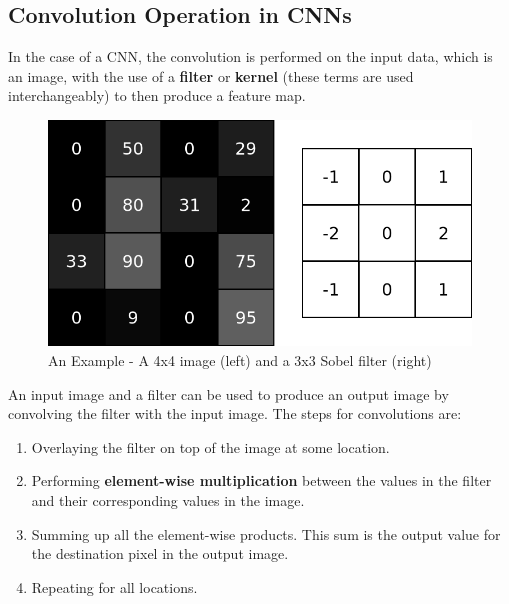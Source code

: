 \documentclass[11pt]{report}
\begin{document}
\subsection{Convolution Operation in CNNs}
In the case of a CNN, the convolution is performed on the input data, which is an image, with the use of a \textbf{filter} or \textbf{kernel} (these terms are used interchangeably) to then produce a feature map.
\begin{figure}[!h] 
	\includegraphics[scale=0.3]{convexample1.png} 
	\centering 
	\caption{An Example - A 4x4 image (left) and a 3x3 Sobel filter (right)}
	\label{convex}
\end{figure}
An input image and a filter can be used to produce an output image by convolving the
filter with the input image. The steps for convolutions are:
\begin{enumerate}
	\item Overlaying the filter on top of the image at some location.
	\item Performing \textbf{element-wise multiplication} between the values in the filter and their corresponding values in the image.
	\item Summing up all the element-wise products. This sum is the output value for the destination pixel in the output image.
	\item Repeating for all locations.
\end{enumerate}
\end{document}
